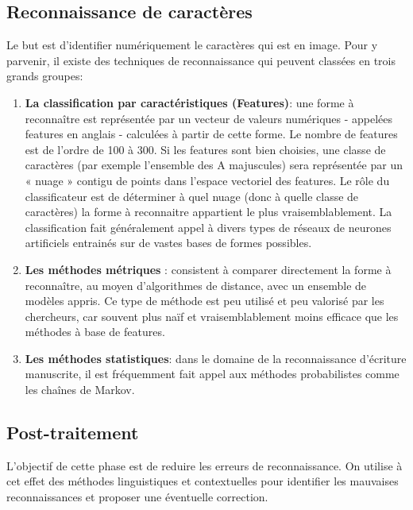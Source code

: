     \subsection{Reconnaissance de caractères}
    Le but est d'identifier numériquement le caractères qui est en image. Pour y parvenir, il existe des techniques de reconnaissance qui peuvent classées en trois grands groupes:
        \begin{enumerate}
            \item \textbf{La classification par caractéristiques (Features)}: une forme à reconnaître est représentée par un vecteur de valeurs numériques - appelées features en anglais - calculées à partir de cette forme. Le nombre de features est de l'ordre de 100 à 300. Si les features sont bien choisies, une classe de caractères (par exemple l'ensemble des A majuscules) sera représentée par un « nuage » contigu de points dans l'espace vectoriel des features. Le rôle du classificateur est de déterminer à quel nuage (donc à quelle classe de caractères) la forme à reconnaitre appartient le plus vraisemblablement. La classification fait généralement appel à divers types de réseaux de neurones artificiels entrainés sur de vastes bases de formes possibles.
            \item \textbf{Les méthodes métriques} : consistent à comparer directement la forme à reconnaître, au moyen d'algorithmes de distance, avec un ensemble de modèles appris. Ce type de méthode est peu utilisé et peu valorisé par les chercheurs, car souvent plus naïf et vraisemblablement moins efficace que les méthodes à base de features.
            \item \textbf{Les méthodes statistiques}: dans le domaine de la reconnaissance d'écriture manuscrite, il est fréquemment fait appel aux méthodes probabilistes comme les chaînes de Markov.\cite{wikiOCR}
        \end{enumerate}

    \subsection{Post-traitement}
    L'objectif de cette phase est de reduire les erreurs de reconnaissance. On utilise à cet effet des méthodes linguistiques et contextuelles pour identifier les mauvaises reconnaissances et proposer une éventuelle correction. 